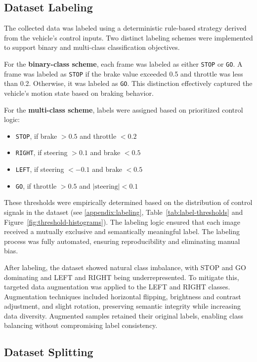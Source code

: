\subsection{Dataset Labeling}

The collected data was labeled using a deterministic rule-based strategy derived from the vehicle’s control inputs. Two distinct labeling schemes were implemented to support binary and multi-class classification objectives.

For the \textbf{binary-class scheme}, each frame was labeled as either \texttt{STOP} or \texttt{GO}. A frame was labeled as \texttt{STOP} if the brake value exceeded 0.5 and throttle was less than 0.2. Otherwise, it was labeled as \texttt{GO}. This distinction effectively captured the vehicle's motion state based on braking behavior.

For the \textbf{multi-class scheme}, labels were assigned based on prioritized control logic:
\begin{itemize}
    \item \texttt{STOP}, if brake $> 0.5$ and throttle $< 0.2$
    \item \texttt{RIGHT}, if steering $> 0.1$ and brake $< 0.5$
    \item \texttt{LEFT}, if steering $< -0.1$ and brake $< 0.5$
    \item \texttt{GO}, if throttle $> 0.5$ and $|\text{steering}| < 0.1$
\end{itemize}


These thresholds were empirically determined based on the distribution of control signals in the dataset (see \cref{appendix:labeling}, Table~\ref{tab:label-thresholds} and Figure~\ref{fig:threshold-histograms}). The labeling logic ensured that each image received a mutually exclusive and semantically meaningful label. The labeling process was fully automated, ensuring reproducibility and eliminating manual bias.

After labeling, the dataset showed natural class imbalance, with STOP and GO dominating and LEFT and RIGHT being underrepresented. To mitigate this, targeted data augmentation was applied to the LEFT and RIGHT classes. Augmentation techniques included horizontal flipping, brightness and contrast adjustment, and slight rotation, preserving semantic integrity while increasing data diversity. Augmented samples retained their original labels, enabling class balancing without compromising label consistency.


\subsection{Dataset Splitting}

